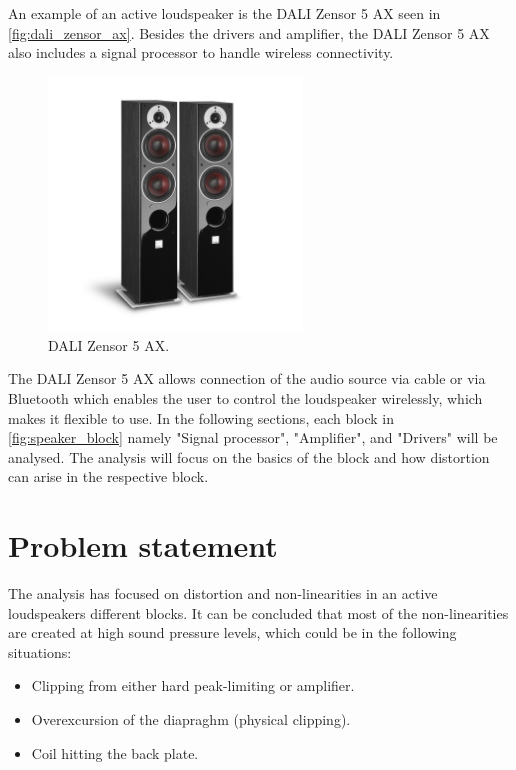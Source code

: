 An example of an active loudspeaker is the DALI Zensor 5 AX seen in \autoref{fig:dali_zensor_ax}. Besides the drivers and amplifier, the DALI Zensor 5 AX also includes a signal processor to handle wireless connectivity.
\begin{figure}[H]
\centering
\includegraphics[width=0.6\textwidth]{figures/dali_zensor_1_ax.jpg}
\caption{DALI Zensor 5 AX.}
\label{fig:dali_zensor_ax}
\end{figure}
The DALI Zensor 5 AX allows connection of the audio source via cable or via Bluetooth which enables the user to control the loudspeaker wirelessly, which makes it flexible to use. In the following sections, each block in \autoref{fig:speaker_block} namely "Signal processor", "Amplifier", and "Drivers" will be analysed. The analysis will focus on the basics of the block and how distortion can arise in the respective block.







%

%

%

%

%

\section{Problem statement} \label{sec:problem_statement}
The analysis has focused on distortion and non-linearities in an active loudspeakers different blocks. It can be concluded that most of the non-linearities are created at high sound pressure levels, which could be in the following situations:
\begin{itemize}
\item Clipping from either hard peak-limiting or amplifier.
\item Overexcursion of the diapraghm (physical clipping). 
\item Coil hitting the back plate. 
\end{itemize}

